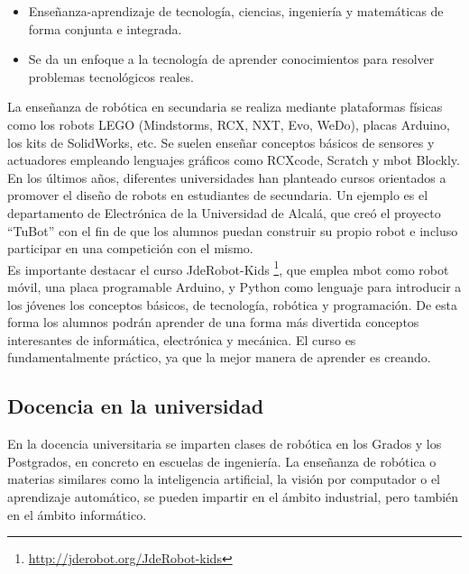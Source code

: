 \begin{itemize}
\item Enseñanza-aprendizaje de tecnología, ciencias, ingeniería y matemáticas de forma conjunta e integrada.
\item Se da un enfoque a la tecnología de aprender conocimientos para resolver problemas tecnológicos reales. 
\end{itemize}

La enseñanza de robótica en secundaria se realiza mediante plataformas físicas como los robots LEGO (Mindstorms, RCX, NXT, Evo, WeDo), placas Arduino, los kits de SolidWorks, etc. Se suelen enseñar conceptos básicos de sensores y actuadores empleando lenguajes gráficos como RCXcode, Scratch y mbot Blockly. \\

En los últimos años, diferentes universidades han planteado cursos orientados a promover el diseño de robots en estudiantes de secundaria. Un ejemplo es el departamento de  Electrónica de la Universidad de Alcalá, que creó el proyecto ``TuBot'' con el fin de que los alumnos puedan construir su propio robot e incluso participar en una competición con el mismo.\\

Es importante destacar el curso JdeRobot-Kids \footnote{\url{http://jderobot.org/JdeRobot-kids}}, que emplea mbot como robot móvil, una placa programable Arduino, y Python como lenguaje para introducir a los jóvenes los conceptos básicos, de tecnología, robótica y programación. De esta forma los alumnos podrán aprender de una forma más divertida conceptos interesantes de informática, electrónica y mecánica. El curso es fundamentalmente práctico, ya que la mejor manera de aprender es creando.

\subsection{Docencia en la universidad}
En la docencia universitaria se imparten clases de robótica en los Grados y los Postgrados, en concreto en escuelas de ingeniería. La enseñanza de robótica o materias similares como la inteligencia artificial, la visión por computador o el aprendizaje automático, se pueden impartir en el ámbito industrial, pero también en el ámbito informático.\\

